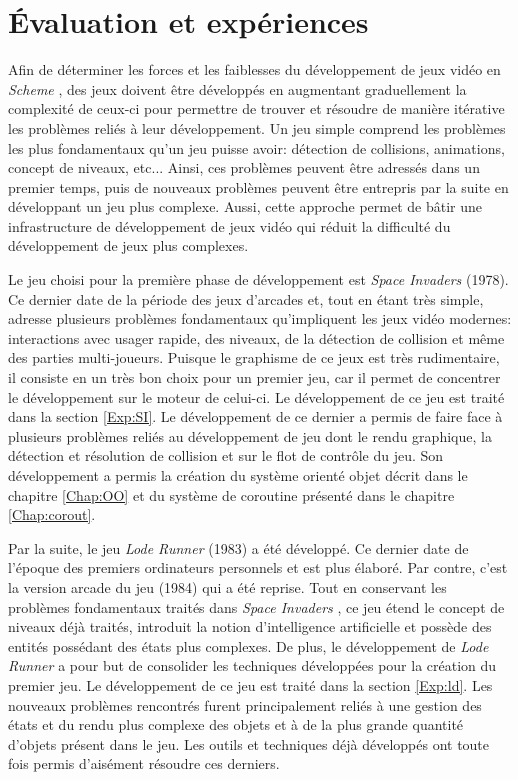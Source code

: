 \documentclass[12pt,twoside,letterpaper,francais]{book}
\newcommand{\lr}{{\textit{Lode Runner }}}
\newcommand{\si}{{\textit{Space Invaders }}}
\newcommand{\Schemelang}{{\textit{Scheme }}}
\begin{document}
\clearpage

\chapter{Évaluation et expériences}\label{Chap:exp}
Afin de déterminer les forces et les faiblesses du développement de
jeux vidéo en \Schemelang, des jeux doivent être développés en
augmentant graduellement la complexité de ceux-ci pour permettre de
trouver et résoudre de manière itérative les problèmes reliés à leur
développement. Un jeu simple comprend les problèmes les plus
fondamentaux qu'un jeu puisse avoir: détection de collisions,
animations, concept de niveaux, etc... Ainsi, ces problèmes peuvent
être adressés dans un premier temps, puis de nouveaux problèmes
peuvent être entrepris par la suite en développant un jeu plus
complexe. Aussi, cette approche permet de bâtir une infrastructure de
développement de jeux vidéo qui réduit la difficulté du développement
de jeux plus complexes.

Le jeu choisi pour la première phase de développement est \si
(1978). Ce dernier date de la période des jeux d'arcades et, tout en
étant très simple, adresse plusieurs problèmes fondamentaux
qu'impliquent les jeux vidéo modernes: interactions avec usager
rapide, des niveaux, de la détection de collision et même des parties
multi-joueurs. Puisque le graphisme de ce jeux est très rudimentaire,
il consiste en un très bon choix pour un premier jeu, car il permet de
concentrer le développement sur le moteur de celui-ci. Le
développement de ce jeu est traité dans la section \ref{Exp:SI}. Le
développement de ce dernier a permis de faire face à plusieurs
problèmes reliés au développement de jeu dont le rendu graphique, la
détection et résolution de collision et sur le flot de contrôle du
jeu. Son développement a permis la création du système orienté objet
décrit dans le chapitre \ref{Chap:OO} et du système de coroutine
présenté dans le chapitre \ref{Chap:corout}.

Par la suite, le jeu \lr (1983) a été développé. Ce dernier date de
l'époque des premiers ordinateurs personnels et est plus élaboré. Par
contre, c'est la version arcade du jeu (1984) qui a été reprise. Tout
en conservant les problèmes fondamentaux traités dans \si, ce jeu
étend le concept de niveaux déjà traités, introduit la notion
d'intelligence artificielle et possède des entités possédant des états
plus complexes. De plus, le développement de \lr a pour but de
consolider les techniques développées pour la création du premier
jeu. Le développement de ce jeu est traité dans la section
\ref{Exp:ld}. Les nouveaux problèmes rencontrés furent principalement
reliés à une gestion des états et du rendu plus complexe des objets et
à de la plus grande quantité d'objets présent dans le jeu. Les outils
et techniques déjà développés ont toute fois permis d'aisément
résoudre ces derniers.
\end{document}
